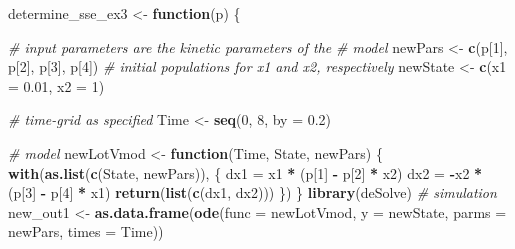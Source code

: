 \documentclass[
]{article}
\newenvironment{Shaded}{\begin{snugshade}}{\end{snugshade}}
\newcommand{\AttributeTok}[1]{\textcolor[rgb]{0.13,0.29,0.53}{#1}}
\newcommand{\CommentTok}[1]{\textcolor[rgb]{0.56,0.35,0.01}{\textit{#1}}}
\newcommand{\ControlFlowTok}[1]{\textcolor[rgb]{0.13,0.29,0.53}{\textbf{#1}}}
\newcommand{\DecValTok}[1]{\textcolor[rgb]{0.00,0.00,0.81}{#1}}
\newcommand{\FloatTok}[1]{\textcolor[rgb]{0.00,0.00,0.81}{#1}}
\newcommand{\FunctionTok}[1]{\textcolor[rgb]{0.13,0.29,0.53}{\textbf{#1}}}
\newcommand{\NormalTok}[1]{#1}
\newcommand{\OtherTok}[1]{\textcolor[rgb]{0.56,0.35,0.01}{#1}}
\newcommand{\SpecialCharTok}[1]{\textcolor[rgb]{0.81,0.36,0.00}{\textbf{#1}}}
\begin{document}
\begin{Shaded}
\begin{Highlighting}[]
\NormalTok{determine\_sse\_ex3 }\OtherTok{\textless{}{-}} \ControlFlowTok{function}\NormalTok{(p) \{}

    \CommentTok{\# input parameters are the kinetic parameters of the}
    \CommentTok{\# model}
\NormalTok{    newPars }\OtherTok{\textless{}{-}} \FunctionTok{c}\NormalTok{(p[}\DecValTok{1}\NormalTok{], p[}\DecValTok{2}\NormalTok{], p[}\DecValTok{3}\NormalTok{], p[}\DecValTok{4}\NormalTok{])}
    \CommentTok{\# initial populations for x1 and x2, respectively}
\NormalTok{    newState }\OtherTok{\textless{}{-}} \FunctionTok{c}\NormalTok{(}\AttributeTok{x1 =} \FloatTok{0.01}\NormalTok{, }\AttributeTok{x2 =} \DecValTok{1}\NormalTok{)}

    \CommentTok{\# time{-}grid as specified}
\NormalTok{    Time }\OtherTok{\textless{}{-}} \FunctionTok{seq}\NormalTok{(}\DecValTok{0}\NormalTok{, }\DecValTok{8}\NormalTok{, }\AttributeTok{by =} \FloatTok{0.2}\NormalTok{)}

    \CommentTok{\# model}
\NormalTok{    newLotVmod }\OtherTok{\textless{}{-}} \ControlFlowTok{function}\NormalTok{(Time, State, newPars) \{}
        \FunctionTok{with}\NormalTok{(}\FunctionTok{as.list}\NormalTok{(}\FunctionTok{c}\NormalTok{(State, newPars)), \{}
\NormalTok{            dx1 }\OtherTok{=}\NormalTok{ x1 }\SpecialCharTok{*}\NormalTok{ (p[}\DecValTok{1}\NormalTok{] }\SpecialCharTok{{-}}\NormalTok{ p[}\DecValTok{2}\NormalTok{] }\SpecialCharTok{*}\NormalTok{ x2)}
\NormalTok{            dx2 }\OtherTok{=} \SpecialCharTok{{-}}\NormalTok{x2 }\SpecialCharTok{*}\NormalTok{ (p[}\DecValTok{3}\NormalTok{] }\SpecialCharTok{{-}}\NormalTok{ p[}\DecValTok{4}\NormalTok{] }\SpecialCharTok{*}\NormalTok{ x1)}
            \FunctionTok{return}\NormalTok{(}\FunctionTok{list}\NormalTok{(}\FunctionTok{c}\NormalTok{(dx1, dx2)))}
\NormalTok{        \})}
\NormalTok{    \}}
    \FunctionTok{library}\NormalTok{(deSolve)}
    \CommentTok{\# simulation}
\NormalTok{    new\_out1 }\OtherTok{\textless{}{-}} \FunctionTok{as.data.frame}\NormalTok{(}\FunctionTok{ode}\NormalTok{(}\AttributeTok{func =}\NormalTok{ newLotVmod, }\AttributeTok{y =}\NormalTok{ newState,}
        \AttributeTok{parms =}\NormalTok{ newPars, }\AttributeTok{times =}\NormalTok{ Time))}


\end{Highlighting}
\end{Shaded}
\end{document}
